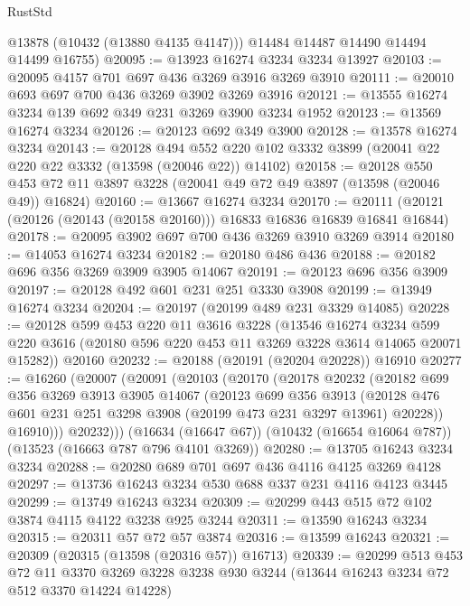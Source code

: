 \begin{lexlean}{RustStd}
\begin{coremodule}
        @13878
        (@10432 (@13880 @4135 @4147)))
      @14484
      @14487
      @14490
      @14494
      @14499
      @16755)
@20095 := @13923 @16274 @3234 @3234 @13927
@20103 := @20095 @4157 @701 @697 @436 @3269 @3916 @3269 @3910
@20111 := @20010 @693 @697 @700 @436 @3269 @3902 @3269 @3916
@20121 := @13555 @16274 @3234 @139 @692 @349 @231 @3269 @3900 @3234 @1952
@20123 := @13569 @16274 @3234
@20126 := @20123 @692 @349 @3900
@20128 := @13578 @16274 @3234
@20143 := @20128
    @494
    @552
    @220
    @102
    @3332
    @3899
    (@20041 @22 @220 @22 @3332 (@13598 (@20046 @22)) @14102)
@20158 := @20128
    @550
    @453
    @72
    @11
    @3897
    @3228
    (@20041 @49 @72 @49 @3897 (@13598 (@20046 @49)) @16824)
@20160 := @13667 @16274 @3234
@20170 := @20111 (@20121 (@20126 (@20143 (@20158 @20160))) @16833 @16836 @16839 @16841 @16844)
@20178 := @20095 @3902 @697 @700 @436 @3269 @3910 @3269 @3914
@20180 := @14053 @16274 @3234
@20182 := @20180 @486 @436
@20188 := @20182 @696 @356 @3269 @3909 @3905 @14067
@20191 := @20123 @696 @356 @3909
@20197 := @20128 @492 @601 @231 @251 @3330 @3908
@20199 := @13949 @16274 @3234
@20204 := @20197 (@20199 @489 @231 @3329 @14085)
@20228 := @20128
    @599
    @453
    @220
    @11
    @3616
    @3228
    (@13546
      @16274
      @3234
      @599
      @220
      @3616
      (@20180 @596 @220 @453 @11 @3269 @3228 @3614 @14065 @20071 @15282))
    @20160
@20232 := @20188 (@20191 (@20204 @20228)) @16910
@20277 := @16260
    (@20007
      (@20091
        (@20103
          (@20170
            (@20178
              @20232
              (@20182
                @699
                @356
                @3269
                @3913
                @3905
                @14067
                (@20123
                  @699
                  @356
                  @3913
                  (@20128 @476 @601 @231 @251 @3298 @3908 (@20199 @473 @231 @3297 @13961) @20228))
                @16910)))
          @20232)))
    (@16634 (@16647 @67))
    (@10432 (@16654 @16064 @787))
    (@13523 (@16663 @787 @796 @4101 @3269))
@20280 := @13705 @16243 @3234 @3234
@20288 := @20280 @689 @701 @697 @436 @4116 @4125 @3269 @4128
@20297 := @13736 @16243 @3234 @530 @688 @337 @231 @4116 @4123 @3445
@20299 := @13749 @16243 @3234
@20309 := @20299 @443 @515 @72 @102 @3874 @4115 @4122 @3238 @925 @3244
@20311 := @13590 @16243 @3234
@20315 := @20311 @57 @72 @57 @3874
@20316 := @13599 @16243
@20321 := @20309 (@20315 (@13598 (@20316 @57)) @16713)
@20339 := @20299
    @513
    @453
    @72
    @11
    @3370
    @3269
    @3228
    @3238
    @930
    @3244
    (@13644 @16243 @3234 @72 @512 @3370 @14224 @14228)

\end{coremodule}
\end{lexlean}
